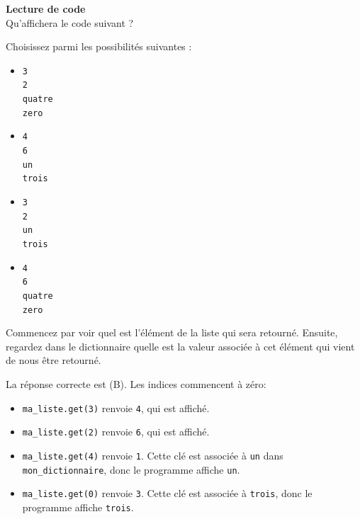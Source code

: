     \begin{Exercice}[5 minutes] \textbf{Lecture de code}\\
      	Qu'affichera le code suivant ?
      	
        
      	
      	Choisissez parmi les possibilités suivantes :
      	
      	\begin{itemize}
      	\item[(A)] \texttt{3} \\
      	\texttt{2} \\
      	\texttt{quatre} \\
      	\texttt{zero}\\
      	\item[(B)] \texttt{4} \\
      	\texttt{6} \\
      	\texttt{un} \\
      	\texttt{trois}\\
      	\item[(C)] \texttt{3} \\
      	\texttt{2} \\
      	\texttt{un} \\
      	\texttt{trois}\\
      	\item[(D)] \texttt{4} \\
      	\texttt{6} \\
      	\texttt{quatre} \\
      	\texttt{zero} \\
      	\end{itemize}
    
        \begin{conseil}
           Commencez par voir quel est l'élément de la liste qui sera retourné. Ensuite, regardez dans le dictionnaire quelle est la valeur associée à cet élément qui vient de nous être retourné.		     
        \end{conseil}
        
        \begin{solution}
            La réponse correcte est (B). Les indices commencent à zéro:
            \begin{itemize}
                \item \texttt{ma\_liste.get(3)} renvoie \texttt{4}, qui est affiché.
                \item \texttt{ma\_liste.get(2)} renvoie \texttt{6}, qui est affiché.
                \item \texttt{ma\_liste.get(4)} renvoie \texttt{1}. Cette clé est associée à \texttt{un} dans \texttt{mon\_dictionnaire}, donc le programme affiche \texttt{un}.
                \item \texttt{ma\_liste.get(0)} renvoie \texttt{3}. Cette clé est associée à \texttt{trois}, donc le programme affiche \texttt{trois}.
            \end{itemize}
        \end{solution}
    \end{Exercice}
    
